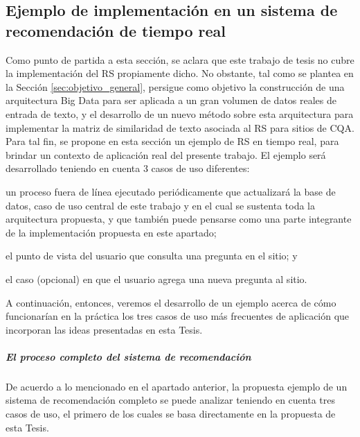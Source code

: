 \subsection{Ejemplo de implementación en un sistema de recomendación de tiempo real}

Como punto de partida a esta sección, se aclara que este trabajo de tesis no cubre la implementación del RS propiamente dicho. No obstante, tal como se plantea en la Sección \ref{sec:objetivo_general}, persigue como objetivo la construcción de una arquitectura Big Data para ser aplicada a un gran volumen de datos reales de entrada de texto, y el desarrollo de un nuevo método sobre esta arquitectura para implementar la matriz de similaridad de texto asociada al RS para sitios de CQA. Para tal fin, se propone en esta sección un ejemplo de RS en tiempo real, para brindar un contexto de aplicación real del presente trabajo. El ejemplo será desarrollado teniendo en cuenta 3 casos de uso diferentes: \begin{enumerate*} [label=(\roman*)] \item un proceso fuera de línea ejecutado periódicamente que actualizará la base de datos, caso de uso central de este trabajo y en el cual se sustenta toda la arquitectura propuesta, y que también puede pensarse como una parte integrante de la implementación propuesta en este apartado; \item el punto de vista del usuario que consulta una pregunta en el sitio; y \item el caso (opcional) en que el usuario agrega una nueva pregunta al sitio.\end{enumerate*}

\bigskip A continuación, entonces, veremos el desarrollo de un ejemplo acerca de cómo funcionarían en la práctica los tres casos de uso más frecuentes de aplicación que incorporan las ideas presentadas en esta Tesis.

\subparagraph{El proceso completo del sistema de recomendación}
De acuerdo a lo mencionado en el apartado anterior, la propuesta ejemplo de un sistema de recomendación completo se puede analizar teniendo en cuenta tres casos de uso, el primero de los cuales se basa directamente en la propuesta de esta Tesis.

